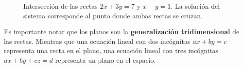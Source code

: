 \begin{example}
\begin{myproof}
\begin{figure}[H]
\caption{Intersección de las rectas $2x + 3y = 7$ y $x - y = 1$. La solución del sistema corresponde al punto donde ambas rectas se cruzan.}
\label{fig:sistema2x2}
\end{figure}
\end{myproof}
\end{example}

\begin{rem} Es importante notar que los planos son la \textbf{generalización tridimensional} de las rectas. Mientras que una ecuación lineal con dos incógnitas $ax + by = c$ representa una recta en el plano, una ecuación lineal con tres incógnitas $ax + by + cz = d$ representa un plano en el espacio.
\end{rem}

